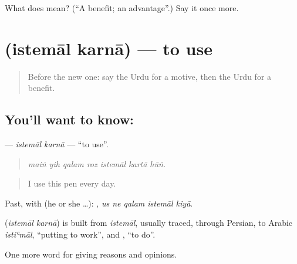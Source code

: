 \begin{tcolorbox}[breakable,colback=teal!4,colframe=teal!35!black,title={Before you move on}]
What does  mean? (\textquotedblleft{}A benefit; an advantage\textquotedblright{}.) Say it once more.
\end{tcolorbox}
\section[\texorpdfstring{\ur{استعمال} \ur{کرنا} (istemāl karnā)}{استعمال کرنا (istemāl karnā)}]{  (istemāl karnā) — to use}

\label{lesson:UR-C333-istemal-karna}



\begin{quote}
Before the new one: say the Urdu for a motive, then the Urdu for a benefit.
\end{quote}

\subsection*{You'll want to know:  }
\textbf{ } — \emph{istemāl karnā} — \textquotedblleft{}to use\textquotedblright{}.

\begin{quote}
      
\end{quote}

\begin{quote}
\emph{maiṅ yih qalam roz istemāl kartā hūṅ.}
\end{quote}

\begin{quote}
I use this pen every day.
\end{quote}

Past, with  (he or she …):     , \emph{us ne qalam istemāl kiyā}.

\begin{cousinweb}
\textbf{ } (\emph{istemāl karnā}) is built from \emph{istemāl}, usually traced, through Persian, to Arabic \emph{istiʿmāl}, \textquotedblleft{}putting to work\textquotedblright{}, and \textbf{}, \textquotedblleft{}to do\textquotedblright{}.
\end{cousinweb}

\begin{grammarlens}[title={What you've built}]
One more word for giving reasons and opinions.
\end{grammarlens}

